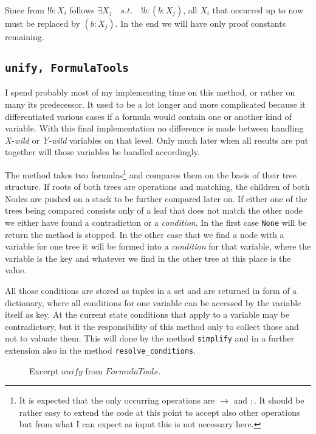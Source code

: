 Since from $!b:X_i$ follows $\exists X_j \quad s.t. \quad !b:(b:X_j)$, all $X_i$ that occurred up to now must be replaced by $(b:X_j)$. In the end we will have only proof constants remaining.

\subsection[unify]{\texttt{unify, FormulaTools}}
I spend probably most of my implementing time on this method, or rather on many its predecessor. It used to be a lot longer and more complicated because it differentiated various cases if a formula would contain one or another kind of variable.
With this final implementation no difference is made between handling \emph{X-wild} or \emph{Y-wild} variables on that level. Only much later when all results are put together will those variables be handled accordingly.

The method takes two formulas\footnote{It is expected that the only occurring operations are $\rightarrow$ and $:$. It should be rather easy to extend the code at this point to accept also other operations but from what I can expect as input this is not necessary here.} and compares them on the basis of their tree structure. If roots of both trees are operations and matching, the children of both Nodes are pushed on a stack to be further compared later on. If either one of the trees being compared consists only of a leaf that does not match the other node we either have found a contradiction or a \emph{condition}. In the first case \texttt{None} will be return the method is stopped. In the other case that we find a node with a variable for one tree it will be formed into a \emph{condition} for that variable, where the variable is the key and whatever we find in the other tree at this place is the value.

All those conditions are stored as tuples in a set and are returned in form of a dictionary, where all conditions for one variable can be accessed by the variable itself as key. At the current state conditions that apply to a variable may be contradictory, but it the responsibility of this method only to collect those and not to valuate them. This will done by the method \texttt{simplify} and in a further extension also in the method \texttt{resolve\_conditions}.

\begin{figure}[H]
	\vspace{-10pt}
	
	\vspace{-10pt}
	\caption{Excerpt $unify$ from $FormulaTools$.}
	\vspace{-10pt}
\end{figure}


